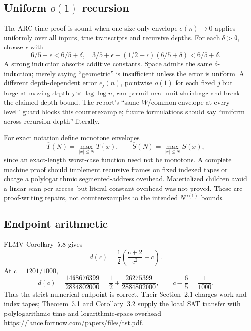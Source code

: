 \documentclass[11pt]{article}
\begin{document}
\subsection*{Uniform $o(1)$ recursion}
The ARC time proof is sound when one size-only envelope $e(n)\to0$ applies
uniformly over all inputs, true transcripts and recursive depths.  For each
$\delta>0$, choose $\epsilon$ with
\[
 6/5+\epsilon<6/5+\delta,
 \quad 3/5+\epsilon+(1/2+\epsilon)(6/5+\delta)<6/5+\delta.
\]
A strong induction absorbs additive constants.  Space admits the same
$\delta$-induction; merely saying ``geometric'' is insufficient unless the
error is uniform.  A different depth-dependent error $e_j(n)$, pointwise
$o(1)$ for each fixed $j$ but large at moving depth $j\asymp\log\log n$,
can permit near-unit shrinkage and break the claimed depth bound.  The report's
``same $W$/common envelope at every level'' guard blocks this counterexample;
future formulations should say ``uniform across recursion depth'' literally.

For exact notation define monotone envelopes
\[
 \overline T(N)=\max_{|x|\le N}T(x),\qquad
 \overline S(N)=\max_{|x|\le N}S(x),
\]
since an exact-length worst-case function need not be monotone.  A complete
machine proof should implement recursive frames on fixed indexed tapes or
charge a polylogarithmic segmented-address overhead.  Materialized children
avoid a linear scan per access, but literal constant overhead was not proved.
These are proof-writing repairs, not counterexamples to the intended
$N^{o(1)}$ bounds.

\subsection*{Endpoint arithmetic}
FLMV Corollary~5.8 gives
\[
 d(c)=\frac12\left(\frac{c+2}{c^2}-c\right).
\]
At $c=1201/1000$,
\[
 d(c)=\frac{1468676399}{2884802000}
 =\frac12+\frac{26275399}{2884802000},
 \qquad c-\frac65=\frac1{1000}.
\]
Thus the strict numerical endpoint is correct.  Their Section~2.1 charges
work and index tapes; Theorem~3.1 and Corollary~3.2 supply the local SAT
transfer with polylogarithmic time and logarithmic-space overhead:
\url{https://lance.fortnow.com/papers/files/tst.pdf}.
\end{document}
